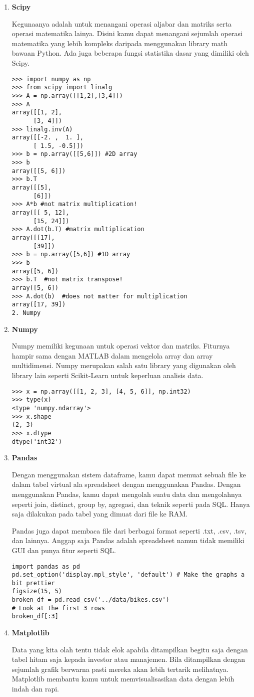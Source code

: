 \begin{enumerate}
    \item \textbf{Scipy}
   \par Kegunaanya adalah untuk menangani operasi aljabar dan matriks serta operasi matematika lainya. Disini kamu dapat menangani sejumlah operasi matematika yang lebih kompleks daripada menggunakan library math bawaan Python. Ada juga beberapa fungsi statistika dasar yang dimiliki oleh Scipy.
    \begin{lstlisting}
>>> import numpy as np
>>> from scipy import linalg
>>> A = np.array([[1,2],[3,4]])
>>> A
array([[1, 2],
      [3, 4]])
>>> linalg.inv(A)
array([[-2. ,  1. ],
      [ 1.5, -0.5]])
>>> b = np.array([[5,6]]) #2D array
>>> b
array([[5, 6]])
>>> b.T
array([[5],
      [6]])
>>> A*b #not matrix multiplication!
array([[ 5, 12],
      [15, 24]])
>>> A.dot(b.T) #matrix multiplication
array([[17],
      [39]])
>>> b = np.array([5,6]) #1D array
>>> b
array([5, 6])
>>> b.T  #not matrix transpose!
array([5, 6])
>>> A.dot(b)  #does not matter for multiplication
array([17, 39])
2. Numpy
\end{lstlisting}
\item \textbf{Numpy}
\par Numpy memiliki kegunaan untuk operasi vektor dan matriks. Fiturnya hampir sama dengan MATLAB dalam mengelola array dan array multidimensi. Numpy merupakan salah satu library yang digunakan oleh library lain seperti Scikit-Learn untuk keperluan analisis data.
\begin{lstlisting}
>>> x = np.array([[1, 2, 3], [4, 5, 6]], np.int32)
>>> type(x)
<type 'numpy.ndarray'>
>>> x.shape
(2, 3)
>>> x.dtype
dtype('int32')
\end{lstlisting}
\item \textbf{Pandas}
\par Dengan menggunakan sistem dataframe, kamu dapat memuat sebuah file ke dalam tabel virtual ala spreadsheet dengan menggunakan Pandas. Dengan menggunakan Pandas, kamu dapat mengolah suatu data dan mengolahnya seperti join, distinct, group by, agregasi, dan teknik seperti pada SQL. Hanya saja dilakukan pada tabel yang dimuat dari file ke RAM.

Pandas juga dapat membaca file dari berbagai format seperti .txt, .csv, .tsv, dan lainnya. Anggap saja Pandas adalah spreadsheet namun tidak memiliki GUI dan punya fitur seperti SQL.
\begin{lstlisting}
import pandas as pd
pd.set_option('display.mpl_style', 'default') # Make the graphs a bit prettier
figsize(15, 5)
broken_df = pd.read_csv('../data/bikes.csv')
# Look at the first 3 rows
broken_df[:3]
\end{lstlisting}
\item \textbf{Matplotlib}
\par Data yang kita olah tentu tidak elok apabila ditampilkan begitu saja dengan tabel hitam saja kepada investor atau manajemen. Bila ditampilkan dengan sejumlah grafik berwarna pasti mereka akan lebih tertarik melihatnya. Matplotlib membantu kamu untuk memvisualisasikan data dengan lebih indah dan rapi.


\end{enumerate}
